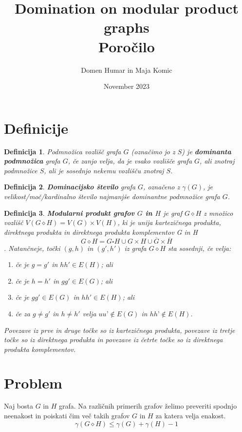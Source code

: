 \documentclass[a4paper,12pt]{article}
\newtheorem{definition}{Definicija}
\begin{document}
\author{Domen Humar in Maja Komic}
\date{November 2023}
\title{
    Domination on modular product graphs \\
    \large Poročilo
    }
\maketitle

\section{Definicije}
\begin{definition}
    Podmnožica vozlišč grafa $G$ (označimo jo z $S$) je \textbf{dominanta podmnožica}
    grafa $G$, če zanjo velja, da je vsako vozlišče grafa $G$, ali znotraj podmnožice $S$,
    ali je sosednjo nekemu vozlišču znotraj $S$.
\end{definition}

\begin{definition}
    \textbf{Dominacijsko število} grafa $G$, označeno z $\gamma(G)$, je velikost/moč/kardinalno število
    najmanjše \emph{dominantne podmnožice} grafa $G$.
\end{definition}

\begin{definition}
    \textbf {Modularni produkt grafov $G$ in $H$} je graf $G\diamond H$ z množico vozlišč $V( G\diamond H) = V(G) \times  V(H)$, ki je 
    unija kartezičnega produkta, direktnega produkta in direktnega produkta komplementov G in H
    $$G \diamond H = G\square H \cup G \times H \cup \overline{G} \times \overline{H} $$.
    Natančneje, točki $(g, h)$ in $(g', h')$ iz grafa $G \diamond H$ sta sosednji, če velja: 
    \begin{enumerate}
        \item če je $g = g'$ in $hh' \in E(H)$; ali 
        \item če je $h = h'$ in $gg' \in E(G)$; ali 
        \item če je $gg' \in E(G)$ in $hh' \in E(H)$; ali
        \item če za $g \neq g'$ in $h \neq h'$ velja $uu’ \notin  E(G)$ in $hh’ \notin  E(H)$. 
    \end{enumerate}
    Povezave iz prve in druge točke so iz kartezičnega produkta, povezave iz tretje točke so iz direktnega produkta
    in povezave iz četrte točke so iz direktnega produkta komplementov.
\end{definition}

\section{Problem}
Naj bosta $G$ in $H$ grafa.
Na različnih primerih grafov želimo preveriti 
spodnjo neenakost in poiskati čim več takih grafov $G$ in $H$ za katera velja enakost.
\begin{equation}
    \gamma(G\diamond H) \leq \gamma (G) + \gamma (H) - 1
\end{equation}
\end{document}
